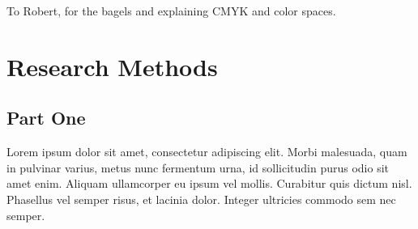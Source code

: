 \documentclass[manuscript,nonacm]{acmart}
\begin{document}
\begin{acks}
To Robert, for the bagels and explaining CMYK and color spaces.
\end{acks}




\appendix
\section{Research Methods}

\subsection{Part One}

Lorem ipsum dolor sit amet, consectetur adipiscing elit. Morbi
malesuada, quam in pulvinar varius, metus nunc fermentum urna, id
sollicitudin purus odio sit amet enim. Aliquam ullamcorper eu ipsum
vel mollis. Curabitur quis dictum nisl. Phasellus vel semper risus, et
lacinia dolor. Integer ultricies commodo sem nec semper.
\end{document}
